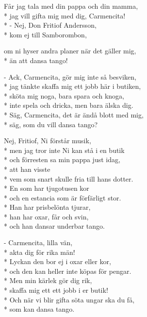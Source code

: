 \begin{SongText}
\begin{SongVerse}
Får jag tala med din pappa och din mamma,\\*%
jag vill gifta mig med dig, Carmencita!\\*%
- Nej, Don Fritiof Andersson,\\*%
kom ej till Samborombon, 
\end{SongVerse}
\begin{SongVerse}
om ni hyser andra planer när det gäller mig,\\*%
än att dansa tango!
\end{SongVerse}
\begin{SongVerse}
- Ack, Carmencita, gör mig inte så besviken,\\*%
jag tänkte skaffa mig ett jobb här i 
butiken,\\*%
sköta mig noga, bara spara och knoga,\\*%
inte spela och dricka, men bara älska dig.\\*%
Säg, Carmencita, det är ändå blott med mig,\\*%
säg, som du vill dansa tango? 
\end{SongVerse}
\begin{SongVerse}
Nej, Fritiof, Ni förstår musik,\\*%
men jag tror inte Ni kan stå i en butik\\*%
och förresten sa min pappa just idag,\\*%
att han visste\\*%
vem som snart skulle fria till hans dotter.\\*%
En som har tjugotusen kor\\*%
och en estancia som är förfärligt stor.\\*%
Han har prisbelönta tjurar,\\*%
han har oxar, får och svin,\\*%
och han dansar underbar tango.
\end{SongVerse}
\begin{SongVerse}
- Carmencita, lilla vän,\\*%
akta dig för rika män!\\*%
Lyckan den bor ej i oxar eller kor,\\*%
och den kan heller inte köpas för pengar.\\*%
Men min kärlek gör dig rik,\\*%
skaffa mig ett ett jobb i er butik!\\*%
Och när vi blir gifta söta ungar ska du få,\\*%
som kan dansa tango. 
\end{SongVerse}
\end{SongText}
